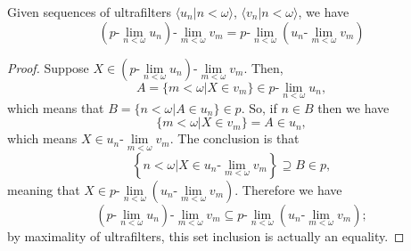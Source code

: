 \documentclass[10pt,a4paper]{amsart}
\newcommand{\ulim}[2]{#1\text{-}\lim\limits_{#2<\omega}}
\begin{document}
\begin{lemma}\label{lem:iteratedulims}
    Given sequences of ultrafilters $\langle u_n\big|n<\omega\rangle$, $\langle v_n\big|n<\omega\rangle$, we have
\begin{equation*}
\ulim{\left(\ulim{p}{n}u_n\right)}{m} v_m=\ulim{p}{n}\left(\ulim{u_n}{m} v_m\right)
\end{equation*}
\end{lemma}

\begin{proof}
    Suppose $X\in\ulim{\left(\ulim{p}{n}u_n\right)}{m}v_m$. Then,
    \begin{equation*}
        A=\{m<\omega\big|X\in v_m\}\in\ulim{p}{n} u_n,
    \end{equation*}
    which means that $B=\{n<\omega\big|A\in u_n\}\in p$. So, if $n\in B$ then we have
    \begin{equation*}
        \{m<\omega\big|X\in v_m\}=A\in u_n,
    \end{equation*}
    which means $X\in\ulim{u_n}{m}v_m$. The conclusion is that
    \begin{equation*}
        \left\{n<\omega\big|X\in\ulim{u_n}{m}v_m\right\}\supseteq B\in p,
    \end{equation*}
    meaning that $X\in\ulim{p}{n}\left(\ulim{u_n}{m} v_m\right)$. Therefore we have
    \begin{equation*}
    \ulim{\left(\ulim{p}{n}u_n\right)}{m} v_m\subseteq\ulim{p}{n}\left(\ulim{u_n}{m} v_m\right);
    \end{equation*}
    by maximality of ultrafilters, this set inclusion is actually an equality.
\end{proof}
\end{document}
